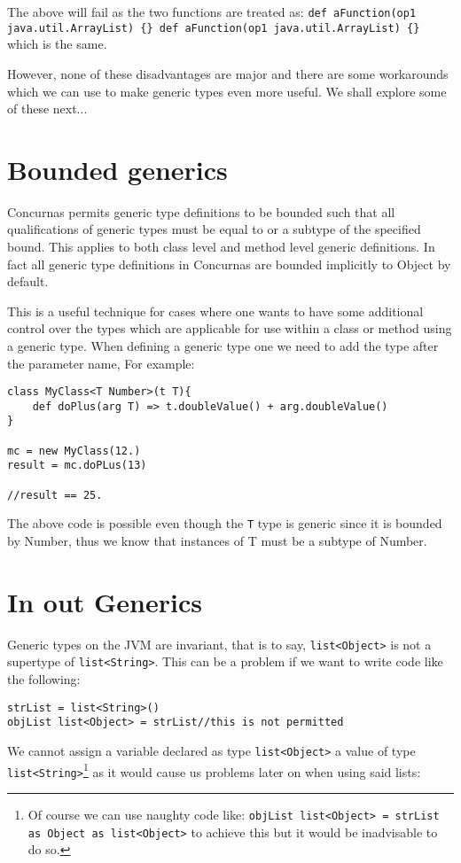 \documentclass[conc-doc]{subfiles}
\begin{document}
The above will fail as the two functions are treated as: \lstinline!def aFunction(op1 java.util.ArrayList) {} def aFunction(op1 java.util.ArrayList) {}! which is the same.

However, none of these disadvantages are major and there are some workarounds which we can use to make generic types even more useful. We shall explore some of these next...

\section{Bounded generics}
Concurnas permits generic type definitions to be bounded such that all qualifications of generic types must be equal to or a subtype of the specified bound. This applies to both class level and method level generic definitions. In fact all generic type definitions in Concurnas are bounded implicitly to Object by default.

This is a useful technique for cases where one wants to have some additional control over the types which are applicable for use within a class or method using a generic type. When defining a generic type one we need to add the type after the parameter name, For example:

\begin{lstlisting}
class MyClass<T Number>(t T){
	def doPlus(arg T) => t.doubleValue() + arg.doubleValue()
}

mc = new MyClass(12.)
result = mc.doPLus(13)

//result == 25.
\end{lstlisting}

The above code is possible even though the \lstinline{T} type is generic since it is bounded by Number, thus we know that instances of T must be a subtype of Number.

\section{In out Generics}
Generic types on the JVM are invariant, that is to say, \lstinline{list<Object>} is not a supertype of \lstinline{list<String>}. This can be a problem if we want to write code like the following:

\begin{lstlisting}
strList = list<String>()
objList list<Object> = strList//this is not permitted
\end{lstlisting}

We cannot assign a variable declared as type \lstinline{list<Object>} a value of type \lstinline{list<String>}\footnote{Of course we can use naughty code like: \lstinline!objList list<Object> = strList as Object as list<Object>! to achieve this but it would be inadvisable to do so.} as it would cause us problems later on when using said lists:
\end{document}
